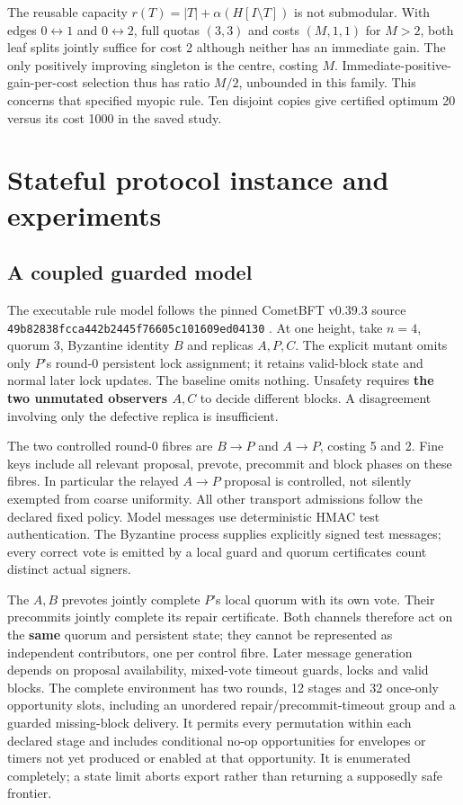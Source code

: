 The reusable capacity \(r(T)=|T|+\alpha(H[I\setminus T])\) is not
submodular. With edges \(0\leftrightarrow1\) and \(0\leftrightarrow2\),
full quotas \((3,3)\) and costs \((M,1,1)\) for \(M>2\), both leaf
splits jointly suffice for cost 2 although neither has an immediate
gain. The only positively improving singleton is the centre, costing
\(M\). Immediate-positive-gain-per-cost selection thus has ratio
\(M/2\), unbounded in this family. This concerns that specified myopic
rule. Ten disjoint copies give certified optimum 20 versus its cost 1000
in the saved study.

\section{Stateful protocol instance and
experiments}\label{stateful-protocol-instance-and-experiments}

\subsection{A coupled guarded model}\label{a-coupled-guarded-model}

The executable rule model follows the pinned CometBFT v0.39.3 source
\nolinkurl{49b82838fcca442b2445f76605c101609ed04130}
\cite{cometbft0393,cometbft0393code}. At one height, take \(n=4\),
quorum 3, Byzantine identity \(B\) and replicas \(A,P,C\). The explicit
mutant omits only \(P\)'s round-0 persistent lock assignment; it retains
valid-block state and normal later lock updates. The baseline omits
nothing. Unsafety requires \textbf{the two unmutated observers \(A,C\)}
to decide different blocks. A disagreement involving only the defective
replica is insufficient.

The two controlled round-0 fibres are \(B\to P\) and \(A\to P\), costing
5 and 2. Fine keys include all relevant proposal, prevote, precommit and
block phases on these fibres. In particular the relayed \(A\to P\)
proposal is controlled, not silently exempted from coarse uniformity.
All other transport admissions follow the declared fixed policy. Model
messages use deterministic HMAC test authentication. The Byzantine
process supplies explicitly signed test messages; every correct vote is
emitted by a local guard and quorum certificates count distinct actual
signers.

The \(A,B\) prevotes jointly complete \(P\)'s local quorum with its own
vote. Their precommits jointly complete its repair certificate. Both
channels therefore act on the \textbf{same} quorum and persistent state;
they cannot be represented as independent contributors, one per control
fibre. Later message generation depends on proposal availability,
mixed-vote timeout guards, locks and valid blocks. The complete
environment has two rounds, 12 stages and 32 once-only opportunity
slots, including an unordered repair/precommit-timeout group and a
guarded missing-block delivery. It permits every permutation within each
declared stage and includes conditional no-op opportunities for
envelopes or timers not yet produced or enabled at that opportunity. It
is enumerated completely; a state limit aborts export rather than
returning a supposedly safe frontier.


